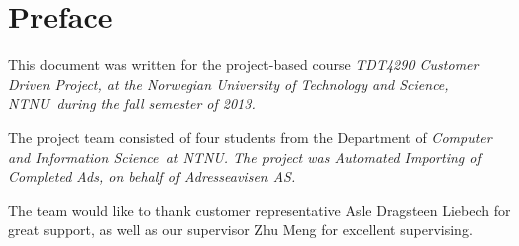 \section*{Preface}
This document was written for the project-based course \em TDT4290 Customer Driven Project\em, at the \em Norwegian University of Technology and Science, NTNU\em \ during the fall semester of 2013.

The project team consisted of four students from the Department of \em Computer and Information Science\em \ at \em NTNU\em. The project was \em Automated Importing of Completed Ads\em, on behalf of \em Adresseavisen AS\em.

The team would like to thank customer representative Asle Dragsteen Liebech for great support, as well as our supervisor Zhu Meng for excellent supervising.